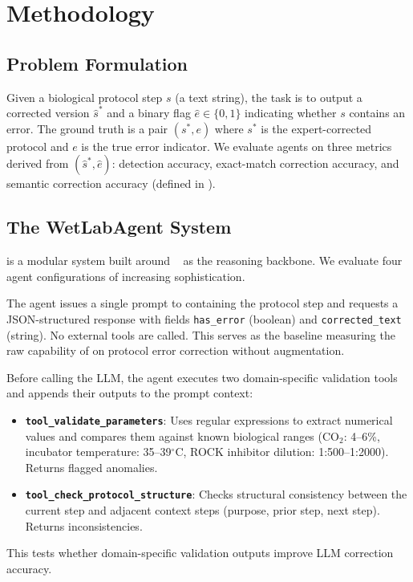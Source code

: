 \section{Methodology}
\label{sec:method}

\subsection{Problem Formulation}
\label{sec:method:problem}

Given a biological protocol step $s$ (a text string), the task is to output a corrected version $\hat{s}^*$ and a binary flag $\hat{e} \in \{0, 1\}$ indicating whether $s$ contains an error.
The ground truth is a pair $(s^*, e)$ where $s^*$ is the expert-corrected protocol and $e$ is the true error indicator.
We evaluate agents on three metrics derived from $(\hat{s}^*, \hat{e})$: detection accuracy, exact-match correction accuracy, and semantic correction accuracy (defined in ).

\subsection{The WetLabAgent System}
\label{sec:method:agent}

\wetlabagent is a modular system built around \claude~\cite{anthropic2026claude} as the reasoning backbone.
We evaluate four agent configurations of increasing sophistication.

The agent issues a single prompt to \claude containing the protocol step and requests a JSON-structured response with fields \texttt{has\_error} (boolean) and \texttt{corrected\_text} (string).
No external tools are called.
This serves as the baseline measuring the raw capability of \claude on protocol error correction without augmentation.

Before calling the LLM, the agent executes two domain-specific validation tools and appends their outputs to the prompt context:
\begin{itemize}[leftmargin=*,itemsep=0pt,topsep=0pt]
    \item \textbf{\texttt{tool\_validate\_parameters}}: Uses regular expressions to extract numerical values and compares them against known biological ranges (CO$_2$: 4--6\%, incubator temperature: 35--39$^\circ$C, ROCK inhibitor dilution: 1:500--1:2000). Returns flagged anomalies.
    \item \textbf{\texttt{tool\_check\_protocol\_structure}}: Checks structural consistency between the current step and adjacent context steps (purpose, prior step, next step). Returns inconsistencies.
\end{itemize}
This tests whether domain-specific validation outputs improve LLM correction accuracy.

